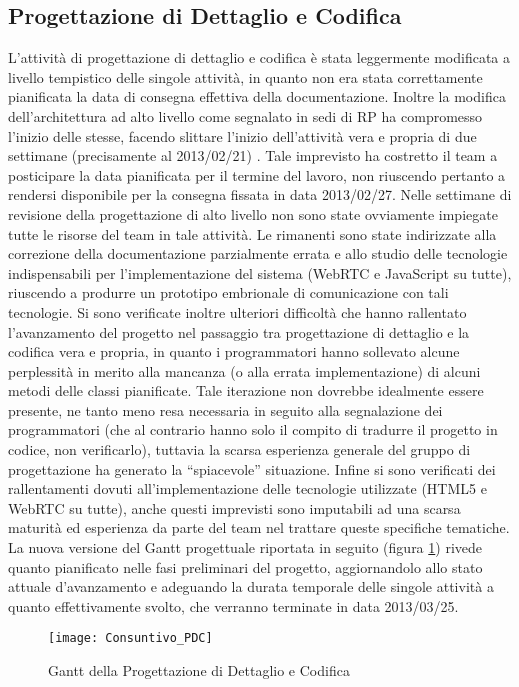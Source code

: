 \subsection{Progettazione di Dettaglio e Codifica}
L'attività di progettazione di dettaglio e codifica è stata leggermente modificata a livello tempistico delle singole attività, in quanto non era stata correttamente pianificata la data di consegna effettiva della documentazione.
Inoltre la modifica dell'architettura ad alto livello come segnalato in sedi di RP ha compromesso l'inizio delle stesse, facendo slittare l'inizio dell'attività vera e propria di due settimane (precisamente al 2013/02/21) .
Tale imprevisto ha costretto il team a posticipare la data pianificata per il termine del lavoro, non riuscendo pertanto a rendersi disponibile per la consegna fissata in data 2013/02/27.
Nelle settimane di revisione della progettazione di alto livello non sono state ovviamente impiegate tutte le risorse del team in tale attività. Le rimanenti sono state indirizzate alla correzione della documentazione parzialmente errata e allo studio delle tecnologie indispensabili per l'implementazione del sistema (WebRTC e JavaScript su tutte), riuscendo a produrre un prototipo embrionale di comunicazione con tali tecnologie.
Si sono verificate inoltre ulteriori difficoltà che hanno rallentato l'avanzamento del progetto nel passaggio tra progettazione di dettaglio e la codifica vera e propria, in quanto i programmatori hanno sollevato alcune perplessità in merito alla mancanza (o alla errata implementazione) di alcuni metodi delle classi pianificate. Tale iterazione non dovrebbe idealmente essere presente, ne tanto meno resa necessaria in seguito alla segnalazione dei programmatori (che al contrario hanno solo il compito di tradurre il progetto in codice, non verificarlo), tuttavia la scarsa esperienza generale del gruppo di progettazione ha generato la ``spiacevole'' situazione.
Infine si sono verificati dei rallentamenti dovuti all'implementazione delle tecnologie utilizzate (HTML5 e WebRTC su tutte), anche questi imprevisti sono imputabili ad una scarsa maturità ed esperienza da parte del team nel trattare queste specifiche tematiche.
La nuova versione del Gantt progettuale riportata in seguito (figura \ref{fig:ganttpdcconsuntivo}) rivede quanto pianificato nelle fasi preliminari del progetto, aggiornandolo allo stato attuale d'avanzamento e adeguando la durata temporale delle singole attività a quanto effettivamente svolto, che verranno terminate in data 2013/03/25.

\begin{figure}[h]
  \texttt{[image: Consuntivo\_PDC]}
\caption{Gantt della Progettazione di Dettaglio e Codifica}\label{fig:ganttpdcconsuntivo}
\end{figure}

